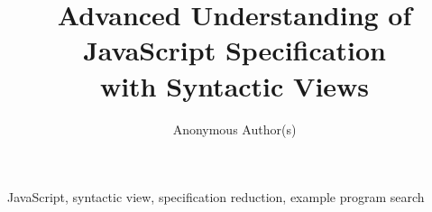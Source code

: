 \documentclass[10pt,conference]{IEEEtran}
\begin{document}
\title{Advanced Understanding of JavaScript Specification\\
with Syntactic Views}

\author{Anonymous Author(s)}

%
%
%
%
%
%

\maketitle












\begin{IEEEkeywords}
JavaScript,
syntactic view,
specification reduction,
example program search
\end{IEEEkeywords}


\balance


\appendix

% 
\end{document}

